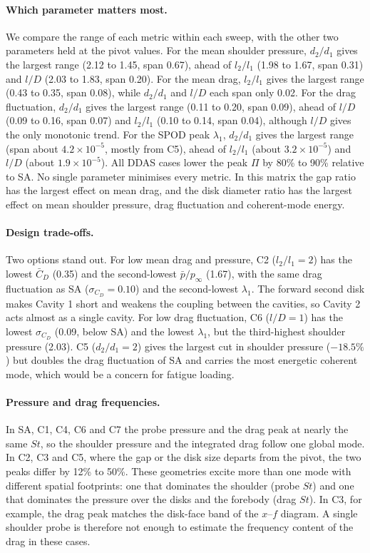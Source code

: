 \documentclass[11pt,a4paper]{article}
\newcommand{\pbar}{\bar{p}/p_\infty}
\newcommand{\Cdm}{\bar{C}_D}
\newcommand{\sCd}{\sigma_{C_D}}
\newcommand{\ltl}{l_2/l_1}
\newcommand{\dtd}{d_2/d_1}
\begin{document}
\paragraph{Which parameter matters most.} We compare the range of each metric within each sweep, with the other two parameters held at the pivot values. For the mean shoulder pressure, $\dtd$ gives the largest range (2.12 to 1.45, span 0.67), ahead of $\ltl$ (1.98 to 1.67, span 0.31) and $l/D$ (2.03 to 1.83, span 0.20). For the mean drag, $\ltl$ gives the largest range (0.43 to 0.35, span 0.08), while $\dtd$ and $l/D$ each span only 0.02. For the drag fluctuation, $\dtd$ gives the largest range (0.11 to 0.20, span 0.09), ahead of $l/D$ (0.09 to 0.16, span 0.07) and $\ltl$ (0.10 to 0.14, span 0.04), although $l/D$ gives the only monotonic trend. For the SPOD peak $\lambda_1$, $\dtd$ gives the largest range (span about $4.2\times10^{-5}$, mostly from C5), ahead of $\ltl$ (about $3.2\times10^{-5}$) and $l/D$ (about $1.9\times10^{-5}$). All DDAS cases lower the peak $\Pi$ by 80\% to 90\% relative to SA. No single parameter minimises every metric. In this matrix the gap ratio has the largest effect on mean drag, and the disk diameter ratio has the largest effect on mean shoulder pressure, drag fluctuation and coherent-mode energy.

\paragraph{Design trade-offs.} Two options stand out. For low mean drag and pressure, C2 ($\ltl = 2$) has the lowest $\Cdm$ (0.35) and the second-lowest $\pbar$ (1.67), with the same drag fluctuation as SA ($\sCd = 0.10$) and the second-lowest $\lambda_1$. The forward second disk makes Cavity 1 short and weakens the coupling between the cavities, so Cavity 2 acts almost as a single cavity. For low drag fluctuation, C6 ($l/D = 1$) has the lowest $\sCd$ (0.09, below SA) and the lowest $\lambda_1$, but the third-highest shoulder pressure (2.03). C5 ($\dtd = 2$) gives the largest cut in shoulder pressure ($-18.5\%$) but doubles the drag fluctuation of SA and carries the most energetic coherent mode, which would be a concern for fatigue loading.

\paragraph{Pressure and drag frequencies.} In SA, C1, C4, C6 and C7 the probe pressure and the drag peak at nearly the same $St$, so the shoulder pressure and the integrated drag follow one global mode. In C2, C3 and C5, where the gap or the disk size departs from the pivot, the two peaks differ by 12\% to 50\%. These geometries excite more than one mode with different spatial footprints: one that dominates the shoulder (probe $St$) and one that dominates the pressure over the disks and the forebody (drag $St$). In C3, for example, the drag peak matches the disk-face band of the $x$--$f$ diagram. A single shoulder probe is therefore not enough to estimate the frequency content of the drag in these cases.
\end{document}
